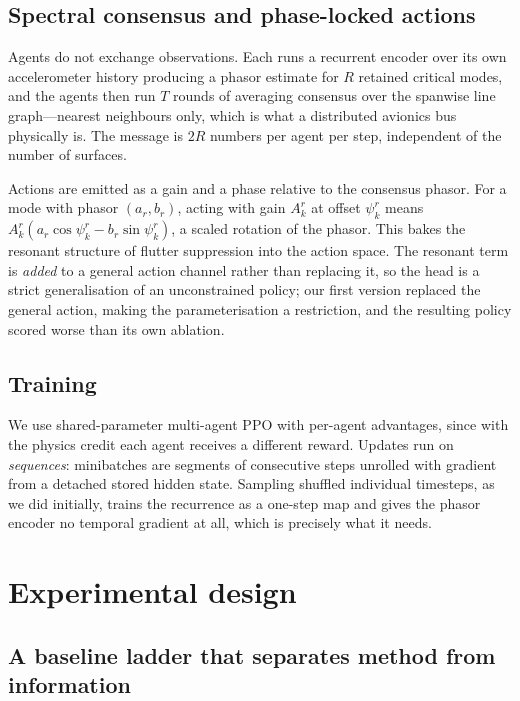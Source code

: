 \documentclass[11pt,a4paper]{article}
\begin{document}
\subsection{Spectral consensus and phase-locked actions}

Agents do not exchange observations. Each runs a recurrent encoder over its own
accelerometer history producing a phasor estimate for $R$ retained critical
modes, and the agents then run $T$ rounds of averaging consensus over the spanwise
line graph---nearest neighbours only, which is what a distributed avionics bus
physically is. The message is $2R$ numbers per agent per step, independent of the
number of surfaces.

Actions are emitted as a gain and a phase relative to the consensus phasor. For a
mode with phasor $(a_r,b_r)$, acting with gain $A_k^r$ at offset $\psi_k^r$ means
$A_k^r (a_r\cos\psi_k^r - b_r\sin\psi_k^r)$, a scaled rotation of the phasor. This
bakes the resonant structure of flutter suppression into the action space. The
resonant term is \emph{added} to a general action channel rather than replacing it,
so the head is a strict generalisation of an unconstrained policy; our first
version replaced the general action, making the parameterisation a restriction,
and the resulting policy scored worse than its own ablation.

\subsection{Training}

We use shared-parameter multi-agent PPO \cite{schulman2017ppo,yu2022mappo} with
per-agent advantages, since with the physics credit each agent receives a
different reward. Updates run on \emph{sequences}: minibatches are segments of
consecutive steps unrolled with gradient from a detached stored hidden state.
Sampling shuffled individual timesteps, as we did initially, trains the recurrence
as a one-step map and gives the phasor encoder no temporal gradient at all, which
is precisely what it needs.

\section{Experimental design}

\subsection{A baseline ladder that separates method from information}
\end{document}

